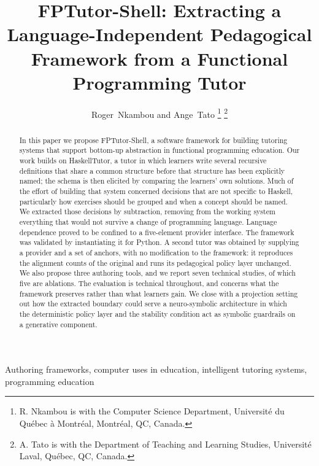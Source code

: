 \documentclass[journal]{IEEEtran}
\begin{document}
\title{FPTutor-Shell: Extracting a Language-Independent Pedagogical Framework from a Functional Programming Tutor}

\author{Roger~Nkambou and Ange~Tato%
\thanks{R. Nkambou is with the Computer Science Department, Universit\'e du Qu\'ebec \`a Montr\'eal, Montr\'eal, QC, Canada.}%
\thanks{A. Tato is with the Department of Teaching and Learning Studies, Universit\'e Laval, Qu\'ebec, QC, Canada.}}

\maketitle

\begin{abstract}
In this paper we propose FPTutor-Shell, a software
framework for building tutoring systems that support bottom-up abstraction
in functional programming education. Our work builds on HaskellTutor, a
tutor in which learners write several recursive definitions that share a
common structure before that structure has been explicitly named; the
schema is then elicited by comparing the learners' own solutions. Much of
the effort of building that system concerned decisions that are not
specific to Haskell, particularly how exercises should be grouped and when
a concept should be named. We extracted those decisions by subtraction,
removing from the working system everything that would not survive a change
of programming language. Language dependence proved to be confined to a
five-element provider interface. The framework was validated by
instantiating it for Python. A second tutor was obtained by supplying a
provider and a set of anchors, with no modification to the framework: it
reproduces the alignment counts of the original and runs its pedagogical
policy layer unchanged. We also propose three authoring tools, and we report
seven technical studies, of which five are ablations.
The evaluation is technical throughout, and concerns what the framework
preserves rather than what learners gain. We close with a projection setting out how the extracted boundary could
serve a neuro-symbolic architecture in which
the deterministic policy layer and the stability condition act as symbolic
guardrails on a generative component.
\end{abstract}

\begin{IEEEkeywords}
Authoring frameworks, computer uses in education,
intelligent tutoring systems, programming education
\end{IEEEkeywords}
\end{document}
